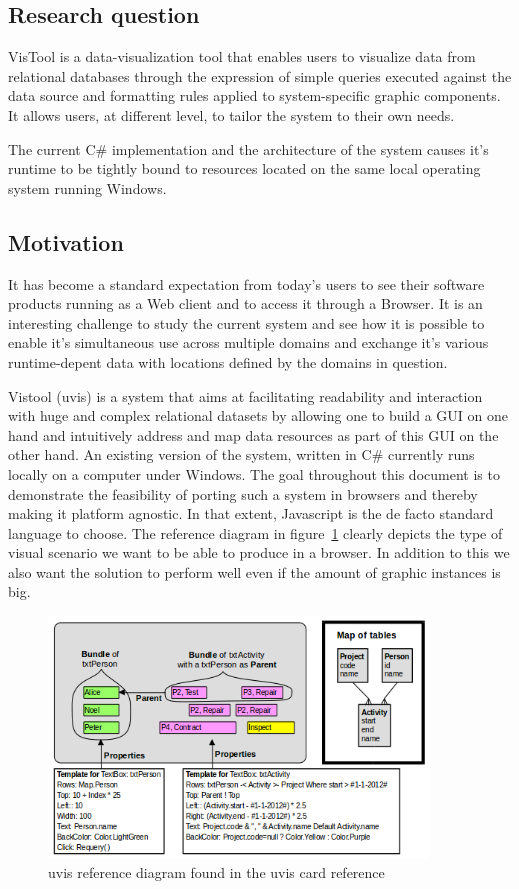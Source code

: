 \subsection{Research question}

VisTool is a data-visualization tool that enables users to visualize data from relational databases through the expression of simple queries executed against the data source and formatting rules applied to system-specific graphic components. It allows users, at different level, to tailor the system to their own needs.

The current C\# implementation and the architecture of the system causes it's runtime to be tightly bound to resources located on the same local operating system running Windows.

\subsection{Motivation}

It has become a standard expectation from today's users to see their software products running as a Web client and to access it through a Browser. It is an interesting challenge to study the current system and see how it is possible to enable it's simultaneous use across multiple domains and exchange it's various runtime-depent data with locations defined by the domains in question.

\iffalse
Vistool (uvis) is a system that aims at facilitating readability and interaction with huge and complex relational datasets by allowing one to build a GUI on one hand and intuitively address and map data resources as part of this GUI on the other hand. An existing version of the system, written in C\# currently runs locally on a computer under Windows. The goal throughout this document is to demonstrate the feasibility of porting such a system in browsers and thereby making it platform agnostic. In that extent, Javascript is the de facto standard language to choose. The reference diagram in figure~\ref{img:refDiagram} clearly depicts the type of visual scenario we want to be able to produce in a browser. In addition to this we also want the solution to perform well even if the amount of graphic instances is big.

\begin{figure}
    \centering
    \includegraphics[width=0.9\textwidth]{images/uvisDiagram.png}
    \caption{uvis reference diagram found in the uvis card reference}
    \label{img:refDiagram}
\end{figure}

